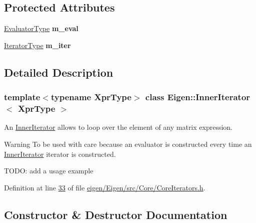 \subsection*{Protected Attributes}
\begin{DoxyCompactItemize}
\item 
\mbox{\label{class_eigen_1_1_inner_iterator_a4c7ff45e97e696ee53a6c05dcae2fc57}} 
\hyperlink{struct_eigen_1_1internal_1_1evaluator}{Evaluator\+Type} {\bfseries m\+\_\+eval}
\item 
\mbox{\label{class_eigen_1_1_inner_iterator_aa7ebd0701b3c10e76a5fc476e7b9f7ae}} 
\hyperlink{class_eigen_1_1internal_1_1inner__iterator__selector}{Iterator\+Type} {\bfseries m\+\_\+iter}
\end{DoxyCompactItemize}


\subsection{Detailed Description}
\subsubsection*{template$<$typename Xpr\+Type$>$\newline
class Eigen\+::\+Inner\+Iterator$<$ Xpr\+Type $>$}

An \hyperlink{class_eigen_1_1_inner_iterator}{Inner\+Iterator} allows to loop over the element of any matrix expression. 

\begin{DoxyWarning}{Warning}
To be used with care because an evaluator is constructed every time an \hyperlink{class_eigen_1_1_inner_iterator}{Inner\+Iterator} iterator is constructed.
\end{DoxyWarning}
T\+O\+DO\+: add a usage example 

Definition at line \hyperlink{eigen_2_eigen_2src_2_core_2_core_iterators_8h_source_l00033}{33} of file \hyperlink{eigen_2_eigen_2src_2_core_2_core_iterators_8h_source}{eigen/\+Eigen/src/\+Core/\+Core\+Iterators.\+h}.



\subsection{Constructor \& Destructor Documentation}
\mbox{\label{class_eigen_1_1_inner_iterator_abbcdcf4d5ecb4445654b7940204cb750}} 

